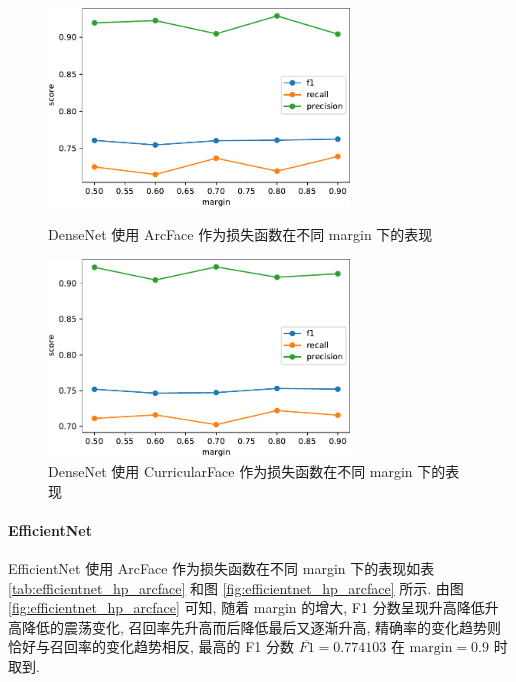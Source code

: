 \documentclass[12pt]{article}
\begin{document}
\begin{figure}[htbp]
  \centering
  \begin{minipage}[t]{0.48\textwidth}
    \centering
    \includegraphics[width=8cm]{densenet_hp_arcface.pdf}
    \caption{DenseNet 使用 ArcFace 作为损失函数在不同 margin 下的表现}
    \label{fig:densenet_hp_arcface}
  \end{minipage}
  \begin{minipage}[t]{0.48\textwidth}
    \centering
    \includegraphics[width=8cm]{densenet_hp_curface.pdf}
    \caption{DenseNet 使用 CurricularFace 作为损失函数在不同 margin 下的表现}
    \label{fig:densenet_hp_curface}
  \end{minipage}
\end{figure}

\paragraph{EfficientNet}

EfficientNet 使用 ArcFace 作为损失函数在不同 margin 下的表现如表 \ref{tab:efficientnet_hp_arcface} 和图 \ref{fig:efficientnet_hp_arcface} 所示. 由图 \ref{fig:efficientnet_hp_arcface} 可知, 随着 margin 的增大, F1 分数呈现升高降低升高降低的震荡变化, 召回率先升高而后降低最后又逐渐升高, 精确率的变化趋势则恰好与召回率的变化趋势相反, 最高的 F1 分数 $\overline{F1}=0.774103$ 在 $\text{margin} = 0.9$ 时取到.
\end{document}
